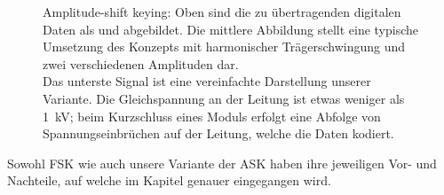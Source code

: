 
\begin{figure}[h!tb]
    \centering
    
    \caption[Amplitude-shift keying]{%
        Amplitude-shift  keying: Oben   sind  die   zu  \"ubertragenden
        digitalen  Daten als   und   abgebildet. Die  mittlere
        Abbildung stellt eine typische Umsetzung des Konzepts mit harmonischer
        Tr\"agerschwingung und zwei verschiedenen Amplituden dar.\protect\\
        Das  unterste   Signal  ist  eine  vereinfachte   Darstellung  unserer
        Variante.  Die  Gleichspannung an  der Leitung  ist etwas  weniger als
        \SI{1}{\kilo\volt}; beim Kurzschluss eines Moduls erfolgt eine Abfolge
        von Spannungseinbr\"uchen auf der Leitung, welche die Daten kodiert.%
    }
    \label{fig:ask:concept}
\end{figure}


Sowohl  FSK wie  auch  unsere  Variante der  ASK  haben  ihre jeweiligen  Vor-
und  Nachteile,  auf  welche im  Kapitel  \emph{}  genauer
eingegangen wird.
